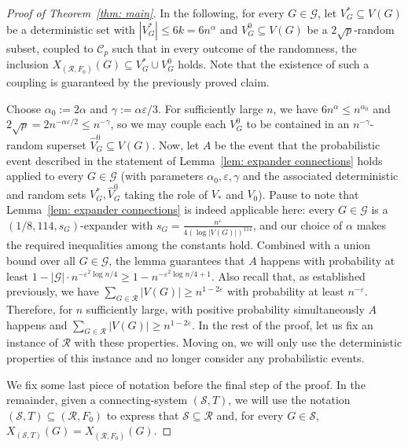 \documentclass[11pt,reqno]{article}
\newenvironment{claimproof}[1][\proofname]{\proof[#1]\renewcommand{\qedsymbol}{$\blacksquare$}}{\endproof}
\begin{document}
\begin{proof}[Proof of Theorem~\ref{thm: main}]
\begin{claimproof}
  \end{claimproof}
  In the following, for every $G\in \mathcal G$, let $V_G^\ast\subseteq V(G)$ be a deterministic set with $|V_G^\ast|\le 6k=6n^\alpha$ and $V_G^0\subseteq V(G)$ be a $2\sqrt{p}$-random subset, coupled to $\mathcal{C}_p$ such that in every outcome of the randomness, the inclusion $X_{(\mathcal R, F_0)}(G)\subseteq V_G^\ast \cup V_G^0$ holds. Note that the existence of such a coupling is guaranteed by the previously proved claim. 
  
  Choose $\alpha_0:=2\alpha$ and $\gamma:=\alpha\varepsilon/3$. For sufficiently large $n$, we have $6n^\alpha\le n^{\alpha_0}$ and $2\sqrt p=2n^{-\alpha\varepsilon/2}\le n^{-\gamma}$, so we may couple each $V_G^0$ to be contained in an $n^{-\gamma}$-random superset $\widehat V_G^0\subseteq V(G)$. Now, let $A$ be the event that the probabilistic event described in the statement of Lemma~\ref{lem: expander connections} holds applied to every $G\in\mathcal G$ (with parameters $\alpha_0, \varepsilon,\gamma$ and the associated deterministic and random sets $V_G^\ast, \widehat V_G^0$ taking the role of $V_*$ and $V_0$). Pause to note that Lemma~\ref{lem: expander connections} is indeed applicable here: every $G\in \mathcal G$ is a $(1/8,114,s_G)$-expander with $s_G=\frac{n^\varepsilon}{4(\log |V(G)|)^{114}}$, and our choice of $\alpha$ makes the required inequalities among the constants hold. Combined with a union bound over all $G\in \mathcal{G}$, the lemma guarantees that $A$ happens with probability at least $1-|\mathcal G|\cdot n^{-\varepsilon^2\log n/4}\geq 1-n^{-\varepsilon^2\log n/4+1}$. Also recall that, as established previously, we have $\sum_{G\in \mathcal{R}}|V(G)|\geq n^{1-2\varepsilon}$ with probability at least $n^{-\varepsilon}$. Therefore, for $n$ sufficiently large, with positive probability simultaneously $A$ happens and $\sum_{G\in \mathcal R}|V(G)|\geq n^{1-2\varepsilon}$. In the rest of the proof, let us fix an instance of $\mathcal R$ with these properties. Moving on, we will only use the deterministic properties of this instance and no longer consider any probabilistic events. 

We fix some last piece of notation before the final step of the proof. In the remainder, given a connecting-system $(\mathcal S, T)$, we will use the notation $(\mathcal S,T)\subseteq (\mathcal R,F_0)$ to express that $\mathcal S\subseteq \mathcal R$ and, for every $G\in\mathcal S$, $X_{(\mathcal S,T)}(G)=X_{(\mathcal R,F_0)}(G)$.


\end{proof}
\end{document}
